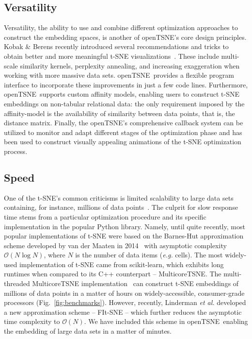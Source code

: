 \documentclass[twocolumn]{bmcart}
\newcommand{\opentsne}{\textsf{openTSNE}}
\begin{document}
\subsection*{Versatility}

Versatility, the ability to use and combine different optimization approaches to construct the embedding spaces, is another of \opentsne's core design principles. Kobak \& Berens recently introduced several recommendations and tricks to obtain better and more meaningful t-SNE visualizations~\cite{kobak2019art}. These include multi-scale similarity kernels, perplexity annealing, and increasing exaggeration when working with more massive data sets. \opentsne\ provides a flexible program interface to incorporate these improvements in just a few code lines. Furthermore, \opentsne\ supports custom affinity models, enabling users to construct t-SNE embeddings on non-tabular relational data: the only requirement imposed by the affinity-model is the availability of similarity between data points, that is, the distance matrix.  Finally, the \opentsne's comprehensive callback system can be utilized to monitor and adapt different stages of the optimization phase and has been used to construct visually appealing animations of the t-SNE optimization process.


\subsection*{Speed}

One of the t-SNE's common criticisms is limited scalability to large data sets containing, for instance, millions of data points~\cite{becht2019dimensionality}. The culprit for slow response time stems from a particular optimization procedure and its specific implementation in the popular Python library. Namely, until quite recently, most popular implementations of t-SNE were based on the Barnes-Hut approximation scheme developed by van der Maaten in 2014~\cite{van2014accelerating} with asymptotic complexity $\mathcal{O}(N \log N)$, where $N$ is the number of data items ({\em e.g.} cells). The most widely-used implementation of t-SNE came from \textsf{scikit-learn}, which exhibits long runtimes when compared to its C++ counterpart -- \textsf{MulticoreTSNE}. The multi-threaded \textsf{MulticoreTSNE} implementation~\cite{Ulyanov2016} can construct t-SNE embeddings of millions of data points in a matter of hours on widely-accessible, consumer-grade processors (Fig.~\ref{fig:benchmarks}). However, recently, Linderman \textit{et al.} developed a new approximation scheme -- FIt-SNE -- which further reduces the asymptotic time complexity to $\mathcal{O}(N)$. We have included this scheme in \opentsne\, enabling the embedding of large data sets in a matter of minutes. 
\end{document}
